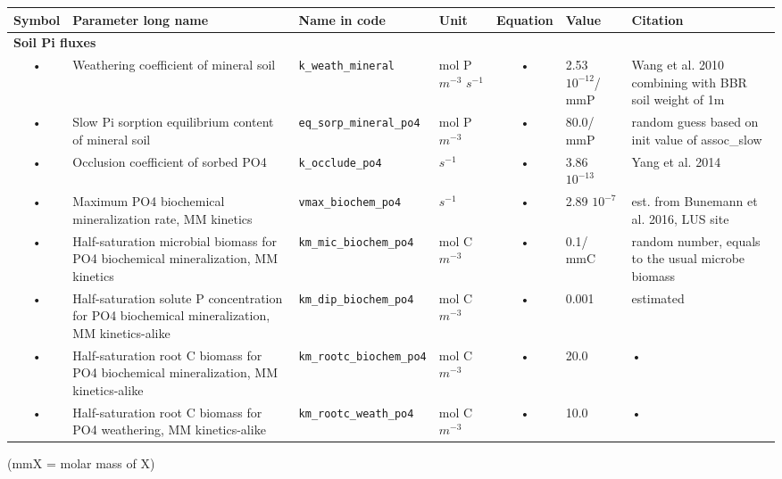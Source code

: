 \begin{table}
\begin{tabularx}{\linewidth}{|c|X|l|l|c|l|X|} %
\hline 
Symbol & Parameter long name & Name in code & Unit & Equation & Value & Citation \\ 
\hline 

\multicolumn{6}{l}{\bf Soil Pi fluxes}\\
\hline
• & Weathering coefficient of mineral soil & \texttt{k\_weath\_mineral} & mol P $m^{-3}$ $s^{-1}$ & • & 2.53 $10^{-12}$/ mmP & Wang et al. 2010 combining with BBR soil weight of 1m \\
• & Slow Pi sorption equilibrium content of mineral soil & \texttt{eq\_sorp\_mineral\_po4} & mol P $m^{-3}$ & • & 80.0/ mmP & random guess based on init value of assoc\_slow \\
• & Occlusion coefficient of sorbed PO4 & \texttt{k\_occlude\_po4} & $s^{-1}$ & • & 3.86 $10^{-13}$ & Yang et al. 2014 \\
• & Maximum PO4 biochemical mineralization rate, MM kinetics & \texttt{vmax\_biochem\_po4} & $s^{-1}$ & • & 2.89 $10^{-7}$ & est. from Bunemann et al. 2016, LUS site \\
• & Half-saturation microbial biomass for PO4 biochemical mineralization, MM kinetics & \texttt{km\_mic\_biochem\_po4} & mol C $m^{-3}$ & • & 0.1/ mmC & random number, equals to the usual microbe biomass \\
• & Half-saturation solute P concentration for PO4 biochemical mineralization, MM kinetics-alike & \texttt{km\_dip\_biochem\_po4} & mol C $m^{-3}$ & • & 0.001 & estimated \\
• & Half-saturation root C biomass for PO4 biochemical mineralization, MM kinetics-alike & \texttt{km\_rootc\_biochem\_po4} & mol C $m^{-3}$ & • & 20.0 & • \\
• & Half-saturation root C biomass for PO4 weathering, MM kinetics-alike & \texttt{km\_rootc\_weath\_po4} & mol C $m^{-3}$ & • & 10.0 & • \\
\hline 
\end{tabularx}
(mmX = molar mass of X)
\end{table}



\pagebreak



